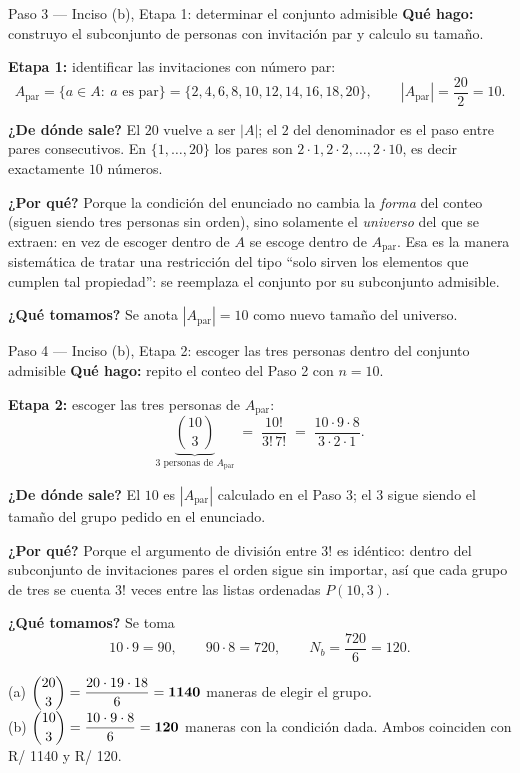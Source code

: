 \documentclass[11pt]{article}
\begin{document}
\begin{paso}{Paso 3 --- Inciso (b), Etapa 1: determinar el conjunto admisible}
\textbf{Qué hago:} construyo el subconjunto de personas con invitación par y calculo su tamaño.

\medskip
\textbf{Etapa 1:} identificar las invitaciones con número par:
\[
  A_{\text{par}}=\{a\in A:\ a \text{ es par}\}=\{2,4,6,8,10,12,14,16,18,20\},\qquad |A_{\text{par}}|=\frac{20}{2}=10 .
\]

\textbf{¿De dónde sale?} El $20$ vuelve a ser $|A|$; el $2$ del denominador es el paso entre pares consecutivos. En $\{1,\dots,20\}$ los pares son $2\cdot 1, 2\cdot 2,\dots,2\cdot 10$, es decir exactamente $10$ números.

\textbf{¿Por qué?} Porque la condición del enunciado no cambia la \emph{forma} del conteo (siguen siendo tres personas sin orden), sino solamente el \emph{universo} del que se extraen: en vez de escoger dentro de $A$ se escoge dentro de $A_{\text{par}}$. Esa es la manera sistemática de tratar una restricción del tipo ``solo sirven los elementos que cumplen tal propiedad'': se reemplaza el conjunto por su subconjunto admisible.

\textbf{¿Qué tomamos?} Se anota $|A_{\text{par}}|=10$ como nuevo tamaño del universo.
\end{paso}

\begin{paso}{Paso 4 --- Inciso (b), Etapa 2: escoger las tres personas dentro del conjunto admisible}
\textbf{Qué hago:} repito el conteo del Paso 2 con $n=10$.

\medskip
\textbf{Etapa 2:} escoger las tres personas de $A_{\text{par}}$:
\[
  \underbrace{\binom{10}{3}}_{\text{3 personas de }A_{\text{par}}} \;=\; \frac{10!}{3!\,7!} \;=\; \frac{10\cdot 9\cdot 8}{3\cdot 2\cdot 1} .
\]

\textbf{¿De dónde sale?} El $10$ es $|A_{\text{par}}|$ calculado en el Paso 3; el $3$ sigue siendo el tamaño del grupo pedido en el enunciado.

\textbf{¿Por qué?} Porque el argumento de división entre $3!$ es idéntico: dentro del subconjunto de invitaciones pares el orden sigue sin importar, así que cada grupo de tres se cuenta $3!$ veces entre las listas ordenadas $P(10,3)$.

\textbf{¿Qué tomamos?} Se toma
\[
  10\cdot 9 = 90,\qquad 90\cdot 8 = 720,\qquad N_b=\frac{720}{6}=120 .
\]
\end{paso}

\begin{resp}
(a) $\dbinom{20}{3}=\dfrac{20\cdot 19\cdot 18}{6}=\mathbf{1140}$ maneras de elegir el grupo.\\[2pt]
(b) $\dbinom{10}{3}=\dfrac{10\cdot 9\cdot 8}{6}=\mathbf{120}$ maneras con la condición dada. Ambos coinciden con R/ 1140 y R/ 120.
\end{resp}
\end{document}
